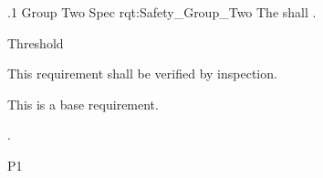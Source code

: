 \ONERQMTV
{\RqtNumberBase.1}
{Group Two Spec}
{rqt:Safety_Group_Two}
{The \ThisSys{} shall \TBD.}
{
	\item [Phase 1] Threshold
}
{This requirement shall be verified by inspection.}
{
\item [N/A] This is a base requirement.
}
{
	\item \TBD.
}
{P1}
